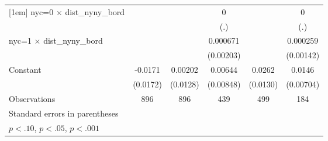 {\begin{tabular}{l*{5}{c}}
[1em]
nyc=0 $\times$ dist\_nyny\_bord&                     &                     &           0         &                     &           0         \\
                    &                     &                     &         (.)         &                     &         (.)         \\
[1em]
nyc=1 $\times$ dist\_nyny\_bord&                     &                     &    0.000671         &                     &    0.000259         \\
                    &                     &                     &   (0.00203)         &                     &   (0.00142)         \\
[1em]
Constant            &     -0.0171         &     0.00202         &     0.00644         &      0.0262\sym{**} &      0.0146\sym{**} \\
                    &    (0.0172)         &    (0.0128)         &   (0.00848)         &    (0.0130)         &   (0.00704)         \\
\hline
Observations        &         896         &         896         &         439         &         499         &         184         \\
\hline\hline
\multicolumn{6}{l}{\footnotesize Standard errors in parentheses}\\
\multicolumn{6}{l}{\footnotesize \sym{*} \(p<.10\), \sym{**} \(p<.05\), \sym{***} \(p<.001\)}\\
\end{tabular}
}
